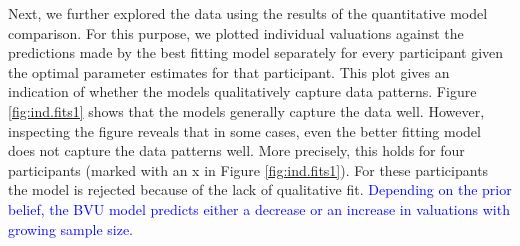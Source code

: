 \documentclass[a4paper, man, natbib, floatsintext]{apa6} %
\begin{document}
Next, we further explored the data using the results of the quantitative model comparison. For this purpose, we plotted individual valuations against the predictions made by the best fitting model separately for every participant given the optimal parameter estimates for that participant. This plot gives an indication of whether the models qualitatively capture data patterns. Figure \ref{fig:ind.fits1} shows that the models generally capture the data well. However, inspecting the figure reveals that in some cases, even the better fitting model does not capture the data patterns well. More precisely, this holds for four participants (marked with an x in Figure \ref{fig:ind.fits1}). For these participants the model is rejected because of the lack of qualitative fit.
\textcolor{blue}{Depending on the prior belief, the BVU model predicts either a decrease or an increase in valuations with growing sample size.}
\end{document}

